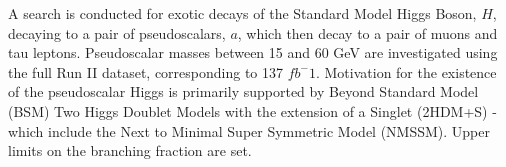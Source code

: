A search is conducted for exotic decays of the Standard Model Higgs Boson, $H$, decaying to a pair of pseudoscalars, $a$, which then decay to a pair of muons and tau leptons. Pseudoscalar masses between 15 and 60 GeV are investigated using the full Run II dataset, corresponding to 137 $fb^-1$. Motivation for the existence of the pseudoscalar Higgs is primarily supported by Beyond Standard Model (BSM) Two Higgs Doublet Models with the extension of a Singlet (2HDM+S) - which include the Next to Minimal Super Symmetric Model (NMSSM). Upper limits on the branching fraction are set.

